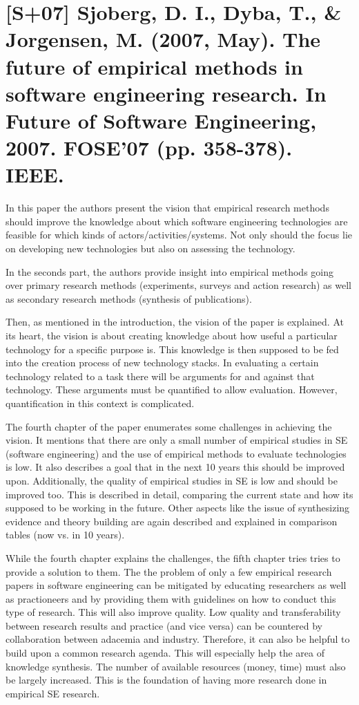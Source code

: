\documentclass[a4paper,12pt,english]{scrartcl}
\newcommand{\papertitle}[2]{
	\section{[#1] #2}
}
\begin{document}
\pagestyle{fancy} %

\papertitle{S+07}{Sjoberg, D. I., Dyba, T., \& Jorgensen, M. (2007, May). The future of empirical methods in software engineering research. In Future of Software Engineering, 2007. FOSE'07 (pp. 358-378). IEEE.}

In this paper the authors present the vision that empirical research methods should improve the knowledge about which software engineering technologies are feasible for which kinds of actors/activities/systems. Not only should the focus lie on developing new technologies but also on assessing the technology.

In the seconds part, the authors provide insight into empirical methods going over primary research methods (experiments, surveys and action research) as well as secondary research methods (synthesis of publications).

Then, as mentioned in the introduction, the vision of the paper is explained. At its heart, the vision is about creating knowledge about how useful a particular technology for a specific purpose is. This knowledge is then supposed to be fed into the creation process of new technology stacks. In evaluating a certain technology related to a task there will be arguments for and against that technology. These arguments must be quantified to allow evaluation. However, quantification in this context is complicated.

The fourth chapter of the paper enumerates some challenges in achieving the vision. It mentions that there are only a small number of empirical studies in SE (software engineering) and the use of empirical methods to evaluate technologies is low. It also describes a goal that in the next 10 years this should be improved upon. Additionally, the quality of empirical studies in SE is low and should be improved too. This is described in detail, comparing the current state and how its supposed to be working in the future. Other aspects like the issue of synthesizing evidence and theory building are again described and explained in comparison tables (now vs. in 10 years).

While the fourth chapter explains the challenges, the fifth chapter tries tries to provide a solution to them. The the problem of only a few empirical research papers in software engineering can be mitigated by educating researchers as well as practioneers and by providing them with guidelines on how to conduct this type of research. This will also improve quality. Low quality and transferability between research results and practice (and vice versa) can be countered by collaboration between adacemia and industry. Therefore, it can also be helpful to build upon a common research agenda. This will especially help the area of knowledge synthesis. The number of available resources (money, time) must also be largely increased. This is the foundation of having more research done in empirical SE research.
\end{document}
